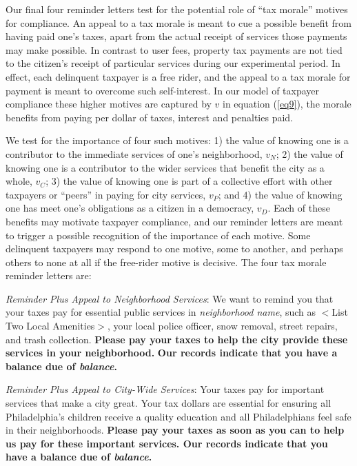 \documentclass[12pt]{article}
\begin{document}
Our final four reminder letters test for the potential role of ``tax
morale'' motives for compliance.  An appeal to a tax morale is meant
to cue a possible benefit from having paid one's taxes, apart from the
actual receipt of services those payments may make possible.  In
contrast to user fees, property tax payments are not tied to the
citizen's receipt of particular services during our experimental
period.  In effect, each delinquent taxpayer is a free rider, and the
appeal to a tax morale for payment is meant to overcome such
self-interest.  In our model of taxpayer compliance these higher
motives are captured by $v$ in equation (\ref{eq9}), the morale benefits
from paying per dollar of taxes, interest and penalties paid.

We test for the importance of four such motives: 1) the value of
knowing one is a contributor to the immediate services of one's
neighborhood, $v_{N}$; 2) the value of knowing one is a contributor to
the wider services that benefit the city as a whole, $v_{C}$; 3) the
value of knowing one is part of a collective effort with other
taxpayers or ``peers'' in paying for city services, $v_{P}$; and 4)
the value of knowing one has meet one's obligations as a citizen in a
democracy, $v_{D}$.  Each of these benefits may motivate taxpayer
compliance, and our reminder letters are meant to trigger a possible
recognition of the importance of each motive.  Some delinquent
taxpayers may respond to one motive, some to another, and perhaps
others to none at all if the free-rider motive is decisive.  The four
tax morale reminder letters are:

\bigskip

\noindent \textit{Reminder Plus Appeal to Neighborhood Services}: We
want to remind you that your taxes pay for essential public services
in \textit{neighborhood name}, such as $<$List Two Local Amenities$>$,
your local police officer, snow removal, street repairs, and trash
collection.  \textbf{Please pay your taxes to help the city provide
  these services in your neighborhood.} \textbf{Our records indicate
  that you have a balance due of \textit{balance}.}

\bigskip

\noindent \textit{Reminder Plus Appeal to City-Wide Services}: Your
taxes pay for important services that make a city great. Your tax
dollars are essential for ensuring all Philadelphia's children receive
a quality education and all Philadelphians feel safe in their
neighborhoods.  \textbf{Please pay your taxes as soon as you can to
  help us pay for these important services.  Our records indicate that
  you have a balance due of \textit{balance}.}
\end{document}
